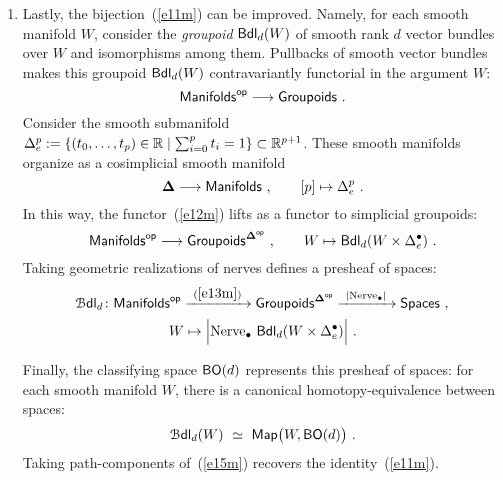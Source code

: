 \begin{enumerate}
\item
Lastly, the bijection~(\ref{e11m}) can be improved.
Namely, for each smooth manifold $W$, consider the \emph{groupoid} ${\sf Bdl}_d(W)$ of smooth rank $d$ vector bundles over $W$ and isomorphisms among them.
Pullbacks of smooth vector bundles makes this groupoid ${\sf Bdl}_d(W)$ contravariantly functorial in the argument $W$:
\begin{equation}
\label{e12m}
{\sf Manifolds}^{\operatorname{\mathsf{op}}}
\longrightarrow
{\sf Groupoids}
~.
\end{equation}
Consider the smooth submanifold $\Delta^p_e:=\{ (t_0,\dots,t_p)\in \mathbb R \mid \sum_{i=0}^p t_i = 1\} \subset \mathbb R^{p+1}$.  
These smooth manifolds organize as a cosimplicial smooth manifold
\[
\mathbf\Delta
\longrightarrow
{\sf Manifolds}
~,\qquad
[p]
\mapsto 
\Delta^p_e
~.
\]
In this way, the functor~(\ref{e12m}) lifts as a functor to simplicial groupoids:
\begin{equation}
\label{e13m}
{\sf Manifolds}^{\operatorname{\mathsf{op}}}
\longrightarrow
{\sf Groupoids}^{\mathbf\Delta^{\operatorname{\mathsf{op}}}}
~,\qquad
W
\mapsto
{\sf Bdl}_d(W \times \Delta^\bullet_e)
~.
\end{equation}
Taking geometric realizations of nerves defines a presheaf of spaces:
\begin{equation}
\label{e14m}
\mathcal B{\sf dl}_d
\colon 
{\sf Manifolds}^{\operatorname{\mathsf{op}}}
\xrightarrow{~(\ref{e13m})~}
{\sf Groupoids}^{\mathbf\Delta^{\operatorname{\mathsf{op}}}}
\xrightarrow{~| {\rm Nerve}_\bullet |~}
{\sf Spaces}
~,
\end{equation}
\[
W
\mapsto
\Bigl|
{\rm Nerve}_\bullet~ {\sf Bdl}_d(W \times \Delta^\bullet_e)
\Bigr|
~.
\]

Finally, the classifying space ${\sf BO}(d)$ represents this presheaf of spaces: 
for each smooth manifold $W$, there is a canonical homotopy-equivalence between spaces:
\begin{equation}
\label{e15m}
\mathcal B{\sf dl}_d(W)
~\simeq~
\operatorname{{\sf Map}}\bigl(
W , {\sf BO}(d)
\bigr)
~.
\end{equation}
Taking path-components of~(\ref{e15m}) recovers the identity~(\ref{e11m}).



\end{enumerate}
  


